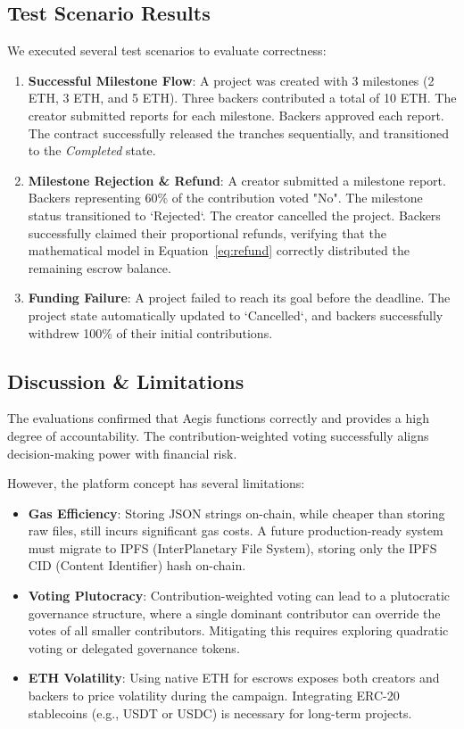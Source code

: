 \documentclass[conference]{IEEEtran}
\begin{document}
\subsection{Test Scenario Results}
We executed several test scenarios to evaluate correctness:
\begin{enumerate}
	\item \textbf{Successful Milestone Flow}: A project was created with 3 milestones (2 ETH, 3 ETH, and 5 ETH). Three backers contributed a total of 10 ETH. The creator submitted reports for each milestone. Backers approved each report. The contract successfully released the tranches sequentially, and transitioned to the \textit{Completed} state.
	\item \textbf{Milestone Rejection \& Refund}: A creator submitted a milestone report. Backers representing 60\% of the contribution voted "No". The milestone status transitioned to `Rejected`. The creator cancelled the project. Backers successfully claimed their proportional refunds, verifying that the mathematical model in Equation~\eqref{eq:refund} correctly distributed the remaining escrow balance.
	\item \textbf{Funding Failure}: A project failed to reach its goal before the deadline. The project state automatically updated to `Cancelled`, and backers successfully withdrew 100\% of their initial contributions.
\end{enumerate}

\subsection{Discussion \& Limitations}
The evaluations confirmed that Aegis functions correctly and provides a high degree of accountability. The contribution-weighted voting successfully aligns decision-making power with financial risk.

However, the platform concept has several limitations:
\begin{itemize}
	\item \textbf{Gas Efficiency}: Storing JSON strings on-chain, while cheaper than storing raw files, still incurs significant gas costs. A future production-ready system must migrate to IPFS (InterPlanetary File System), storing only the IPFS CID (Content Identifier) hash on-chain.
	\item \textbf{Voting Plutocracy}: Contribution-weighted voting can lead to a plutocratic governance structure, where a single dominant contributor can override the votes of all smaller contributors. Mitigating this requires exploring quadratic voting or delegated governance tokens.
	\item \textbf{ETH Volatility}: Using native ETH for escrows exposes both creators and backers to price volatility during the campaign. Integrating ERC-20 stablecoins (e.g., USDT or USDC) is necessary for long-term projects.
\end{itemize}
\end{document}

